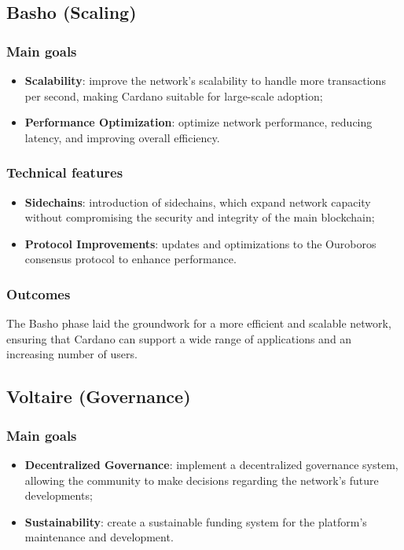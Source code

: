 \vspace{0.5cm}

\subsection{Basho (Scaling)}

\subsubsection*{Main goals}
\begin{itemize}
    \item \textbf{Scalability}: improve the network's scalability to handle more 
        transactions per second, making Cardano suitable for large-scale adoption;
    \item \textbf{Performance Optimization}: optimize network performance, reducing 
        latency, and improving overall efficiency.
\end{itemize}

\subsubsection*{Technical features}
\begin{itemize}
    \item \textbf{Sidechains}: introduction of sidechains, which expand network capacity 
        without compromising the security and integrity of the main blockchain;
    \item \textbf{Protocol Improvements}: updates and optimizations to the Ouroboros 
        consensus protocol to enhance performance.
\end{itemize}

\subsubsection*{Outcomes}
The Basho phase laid the groundwork for a more efficient and scalable network, ensuring 
that Cardano can support a wide range of applications and an increasing number of users.

\vspace{0.5cm}

\subsection{Voltaire (Governance)}

\subsubsection*{Main goals}
\begin{itemize}
    \item \textbf{Decentralized Governance}: implement a decentralized governance system, 
        allowing the community to make decisions regarding the network's future developments;
    \item \textbf{Sustainability}: create a sustainable funding system for the platform's 
        maintenance and development.
\end{itemize}


